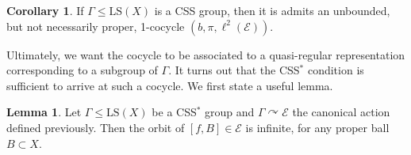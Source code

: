 \documentclass[12pt]{amsart}
\numberwithin{equation}{subsection}
\theoremstyle{definition}
\newtheorem{lemma}[theorem]{Lemma}
\newtheorem{corollary}[theorem]{Corollary}
\theoremstyle{definition}
\theoremstyle{remark}
\begin{document}
\begin{corollary} If $\Gamma \leq \text{LS}(X)$ is a CSS group, then it is admits an unbounded, but not necessarily proper, 1-cocycle $(b,\pi,\mathcal \ell^2(\mathcal E))$.  
\end{corollary}



Ultimately, we want the cocycle to be associated to a quasi-regular representation corresponding to a subgroup of $\Gamma$. It turns out that the CSS$^*$ condition is sufficient to arrive at such a cocycle. We first state a useful lemma. 

\begin{lemma}\label{lemma:inforbit}
     Let $\Gamma \leq \text{LS}(X)$ be a CSS$^*$ group and $\Gamma \curvearrowright \mathcal E$ the canonical action defined previously. Then the orbit of $[f,B] \in \mathcal E$ is infinite, for any proper ball $B \subset X$. 
\end{lemma}
\end{document}
